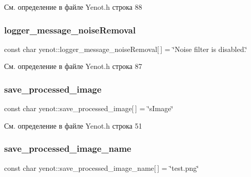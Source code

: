 См. определение в файле Yenot.\+h строка 88

\mbox{\label{namespaceyenot_a27e7d588bfc41ad2d47d044d4541dad5}} 
\subsubsection{\texorpdfstring{logger\+\_\+message\+\_\+noise\+Removal}{logger\_message\_noiseRemoval}}
{\footnotesize\ttfamily const char yenot\+::logger\+\_\+message\+\_\+noise\+Removal\mbox{[}$\,$\mbox{]} = \char`\"{}Noise filter is disabled.\char`\"{}}



См. определение в файле Yenot.\+h строка 87

\mbox{\label{namespaceyenot_ab35e22cfa0a4ef6c8e960cfa75873aa0}} 
\subsubsection{\texorpdfstring{save\+\_\+processed\+\_\+image}{save\_processed\_image}}
{\footnotesize\ttfamily const char yenot\+::save\+\_\+processed\+\_\+image\mbox{[}$\,$\mbox{]} = \char`\"{}s\+Image\char`\"{}}



См. определение в файле Yenot.\+h строка 51

\mbox{\label{namespaceyenot_afe93bb98a5b2fd1f0cab330e4da59332}} 
\subsubsection{\texorpdfstring{save\+\_\+processed\+\_\+image\+\_\+name}{save\_processed\_image\_name}}
{\footnotesize\ttfamily const char yenot\+::save\+\_\+processed\+\_\+image\+\_\+name\mbox{[}$\,$\mbox{]} = \char`\"{}test.\+png\char`\"{}}



